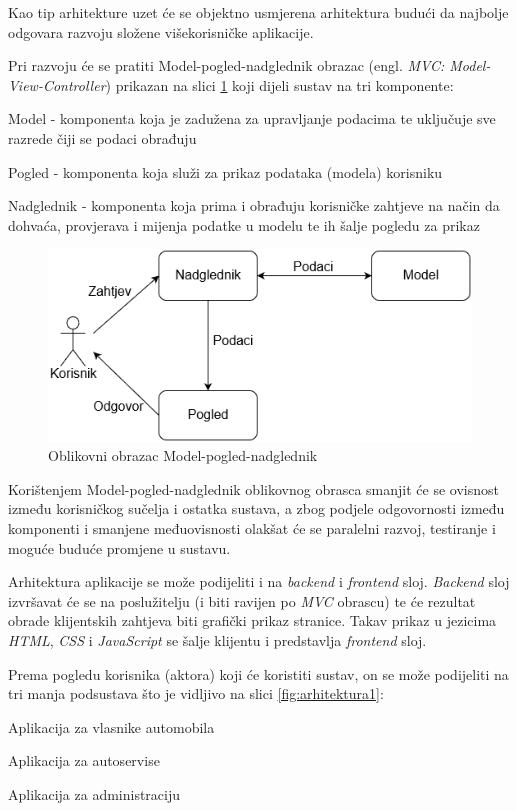 		
		Kao tip arhitekture uzet će se objektno usmjerena arhitektura budući da najbolje odgovara razvoju složene višekorisničke aplikacije. 
		
		Pri razvoju će se pratiti Model-pogled-nadglednik obrazac (engl. \textit{MVC: Model-View-Controller}) prikazan na slici \ref{fig:mvc} koji dijeli sustav na tri komponente:
		\begin{packed_item}
			\item Model - komponenta koja je zadužena za upravljanje podacima te uključuje sve razrede čiji se podaci obrađuju
			\item Pogled - komponenta koja služi za prikaz podataka (modela) korisniku
			\item Nadglednik - komponenta koja prima i obrađuju korisničke zahtjeve na način da dohvaća, provjerava i mijenja podatke u modelu te ih šalje pogledu za prikaz
		\end{packed_item}
		
		\begin{figure}[h]
			\centering
			\includegraphics[width=0.7\linewidth]{slike/mvc}
			\caption{Oblikovni obrazac Model-pogled-nadglednik}
			\label{fig:mvc}
		\end{figure}
		
		Korištenjem Model-pogled-nadglednik oblikovnog obrasca smanjit će se ovisnost između korisničkog sučelja i ostatka sustava, a zbog podjele odgovornosti između komponenti i smanjene međuovisnosti olakšat će se paralelni razvoj, testiranje i moguće buduće promjene u sustavu.
		
		Arhitektura aplikacije se može podijeliti i na \textit{backend} i \textit{frontend} sloj. \textit{Backend} sloj izvršavat će se na poslužitelju (i biti ravijen po \textit{MVC} obrascu) te će rezultat obrade klijentskih zahtjeva biti grafički prikaz stranice. Takav prikaz u jezicima \textit{HTML}, \textit{CSS} i \textit{JavaScript} se šalje klijentu i predstavlja \textit{frontend} sloj.
		
		Prema pogledu korisnika (aktora) koji će koristiti sustav, on se može podijeliti na tri manja podsustava što je vidljivo na slici \ref{fig:arhitektura1}:
		\begin{packed_item}
			\item Aplikacija za vlasnike automobila
			\item Aplikacija za autoservise
			\item Aplikacija za administraciju 
		\end{packed_item}
	

